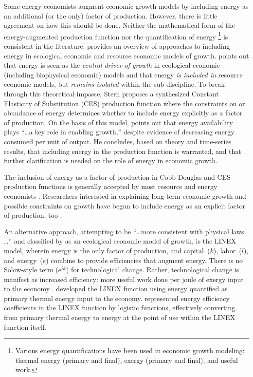 \documentclass[preprint,authoryear,12pt]{elsarticle}\usepackage[]{graphicx}\usepackage[]{color}
\begin{document}
Some energy economists augment economic growth models by including energy as an 
additional (or the only) factor of production. 
However, there is little agreement on how this should be done. 
Neither the mathematical form of the energy-augmented 
production function nor the quantification of energy%
  \footnote{
  Various energy quantifications have been used in economic growth modeling: 
  thermal energy (primary and final), 
  exergy (primary and final), and useful work.
  }
is consistent in the literature. 
\citet[p.~26]{Stern:2011bq} provides an overview of approaches to including energy 
in ecological economic and resource economic models of growth.  
\citeauthor{Stern:2011bq} points out that 
energy is seen as the \emph{central driver of growth} 
in ecological economic (including biophysical economic) models
and that energy \emph{is included in} resource economic models, 
but \emph{remains isolated} within the sub-discipline.  
To break through this theoretical impasse, 
Stern proposes a synthesized Constant Elasticity of Substitution (CES) 
production function 
where the constraints on or abundance of energy 
determines whether to include energy explicitly 
as a factor of production.  
On the basis of this model, 
\citet[p. 45]{Stern:2011bq} points out that 
energy availability plays
``\dots{}a key role in enabling growth,''
despite evidence of decreasing energy consumed per unit of output.  
He concludes, based on theory and time-series results, 
that including energy in the production function is warranted, 
and that further clarification is needed 
on the role of energy in economic growth.  

The inclusion of energy as a factor of production 
in Cobb-Douglas and CES production functions 
is generally accepted by most 
resource and energy economists \citep{Smulders:2003wc, vanderZwaan:2002wn, Kemfert:1998vd}.
Researchers interested in explaining long-term economic growth 
and possible constraints on growth 
have begun to include energy 
as an explicit factor of production, too \citep{Froling:2009vo, Tahvonen:2001tz}.

An alternative approach, attempting to be 
``\dots more consistent with physical laws \dots'' \citep{Ayres:2001tx}
and classified by \citet{Stern:2011bq} as an ecological economic model of growth, 
is the LINEX model, 
wherein energy is the only factor of production,
and capital~($k$), labor~($l$), and energy~($e$)
combine to provide efficiencies that augment energy.
There is no Solow-style term ($\mathrm{e}^{\lambda t}$) for technological change.
Rather, technological change is manifest as increased efficiency:
more useful work done per joule of exergy input to the economy \citep{Ayres:2005kn}.
\citet{Kummel:1980wx} developed the LINEX function
using energy quantified as primary thermal energy input to the economy.
\citeauthor{Kummel:1980wx} represented 
energy efficiency coefficients in the LINEX function by logistic functions,
effectively converting from primary thermal energy to energy at the point of use
within the LINEX function itself.
\end{document}
